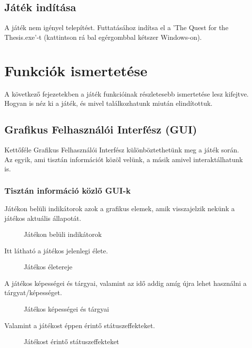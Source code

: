 \subsection{Játék indítása}
A játék nem igényel telepítést. Futtatásához indítsa el a 'The Quest for the Thesis.exe'-t (kattintson rá bal egérgombbal kétszer Windows-on).

\newpage
\section{Funkciók ismertetése}
A következő fejezetekben a játék funkcióinak részletesebb ismertetése lesz kifejtve. Hogyan is néz ki a játék, és mivel találkozhatunk miután elindítottuk.

\subsection{Grafikus Felhasználói Interfész (GUI)}
Kettőféle Grafikus Felhasználói Interfész különböztethetünk meg a játék során. Az egyik, ami tisztán információt közöl velünk, a másik amivel interaktálhatunk is.
\subsubsection{Tisztán információ közlő GUI-k}
Játékon belüli indikátorok azok a grafikus elemek, amik visszajelzik nekünk a játékos aktuális állapotát. 
\begin{figure}[htb]
	\noindent{}
	\caption{Játékon belüli indikátorok}
	\label{inUse}
\end{figure}

Itt látható a játékos jelenlegi élete.
\begin{figure}[htb]
	\noindent{}
	\caption{Játékos életereje}
	\label{inUseHealth}
\end{figure}

A játékos képességei és tárgyai, valamint az idő addig amíg újra lehet használni a tárgyat/képességet.
\begin{figure}[htb]
	\noindent{}
	\caption{Játékos képességei és tárgyai}
	\label{inUseItems}
\end{figure}

Valamint a játékost éppen érintő státuszeffekteket.
\begin{figure}[htb]
	\noindent{}
	\caption{Játékost érintő státuszeffekteket}
	\label{inUseStatuses}
\end{figure}

